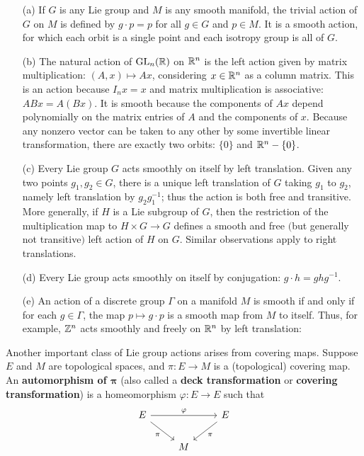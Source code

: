 \begin{example}
\mbox{}
\begin{itemize}
\item[(a)] If $G$ is any Lie group and $M$ is any smooth manifold, the trivial action of $G$ on $M$ is defined by $g\cdot p=p$ for all $g\in G$ and $p\in M$. It is a smooth action, for which each orbit is a single point and each isotropy group is all of $G$.
\item[(b)] The natural action of $\mathrm{GL}_n(\mathbb{R})$ on $\mathbb{R}^n$ is the left action given by matrix multiplication: $(A,x)\mapsto Ax$, considering $x\in\mathbb{R}^n$ as a column matrix. This is an action because $I_nx=x$ and matrix multiplication is associative: $ABx=A(Bx)$. It is smooth because the components of $Ax$ depend polynomially on the matrix entries of $A$ and the components of $x$. Because any nonzero vector can be taken to any other by some invertible linear transformation, there are exactly two orbits: $\{0\}$ and $\mathbb{R}^n-\{0\}$.
\item[(c)] Every Lie group $G$ acts smoothly on itself by left translation. Given any two points $g_1,g_2\in G$, there is a unique left translation of $G$ taking $g_1$ to $g_2$, namely left translation by $g_2g_1^{-1}$; thus the action is both free and transitive. More generally, if $H$ is a Lie subgroup of $G$, then the restriction of the multiplication map to $H\times G\to G$ defines a smooth and free $($but generally not transitive$)$ left action of $H$ on $G$. Similar observations apply to right translations.
\item[(d)] Every Lie group acts smoothly on itself by conjugation: $g\cdot h=ghg^{-1}$.
\item[(e)] An action of a discrete group $\Gamma$ on a manifold $M$ is smooth if and only if for each $g\in\Gamma$, the map $p\mapsto g\cdot p$ is a smooth map from $M$ to itself. Thus, for example, $\mathbb{Z}^n$ acts smoothly and freely on $\mathbb{R}^n$ by left translation:
\end{itemize}
\end{example}
Another important class of Lie group actions arises from covering maps. Suppose $E$ and $M$ are topological spaces, and $\pi:E\to M$ is a (topological) covering
map. An \textbf{automorphism of $\bm{\pi}$} (also called a \textbf{deck transformation} or \textbf{covering transformation}) is a homeomorphism $\varphi:E\to E$ such that
\[\begin{tikzcd}
E\ar[rr,"\varphi"]\ar[rd,swap,"\pi"]&&E\ar[ld,"\pi"]\\
&M&
\end{tikzcd}\]
